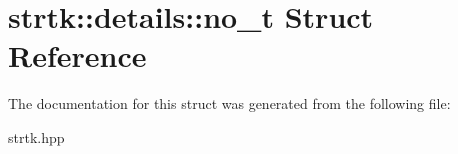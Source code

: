 \hypertarget{structstrtk_1_1details_1_1no__t}{\section{strtk\-:\-:details\-:\-:no\-\_\-t Struct Reference}
\label{structstrtk_1_1details_1_1no__t}
}


The documentation for this struct was generated from the following file\-:\begin{DoxyCompactItemize}
\item 
strtk.\-hpp\end{DoxyCompactItemize}
